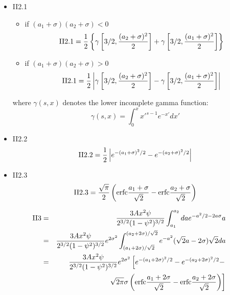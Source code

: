 \documentclass{book}
\begin{document}
\begin{itemize}
\item II2.1
  \begin{itemize}
  \item if $(a_1 + \sigma)(a_2 + \sigma) < 0$
    \begin{equation*}
      \text{II2.1} =  {1 \over 2} \left\{
        \gamma\left[ 3/2, {(a_2 + \sigma)^2 \over 2} \right] +
        \gamma\left[ 3/2, {(a_1 + \sigma)^2 \over 2} \right]
      \right\}
    \end{equation*}
  \item if $(a_1 + \sigma)(a_2 + \sigma) > 0$
    \begin{equation*}
      \text{II2.1} =  {1 \over 2} \left|
        \gamma\left[3/2, {(a_2 + \sigma)^2 \over 2}\right] -
        \gamma\left[3/2, {(a_1 + \sigma)^2\over 2}\right]
      \right|
    \end{equation*}
  \end{itemize}
  where $\gamma(s, x)$ denotes the lower incomplete gamma function:
  \begin{equation*}
    \gamma(s, x) = \int_0^x x'^{s-1} e^{-x'} dx'
  \end{equation*}
\item II2.2
  \begin{equation*}
    \text{II2.2} = {1 \over 2} \left|
      e^{-(a_1 + \sigma)^2/2} - e^{-(a_2 + \sigma)^2/2}
    \right|
  \end{equation*}
\item II2.3
  \begin{equation*}
    \text{II2.3} = {\sqrt{\pi} \over 2} \left(
      \text{erfc} {a_1 + \sigma \over \sqrt 2} - \text{erfc} {a_2 + \sigma \over \sqrt 2}
    \right)
  \end{equation*}
\end{itemize}
\begin{eqnarray*}
  \text{II3} &=& {3Ax^2\psi \over 2^{3/2}(1 - \psi^2)^{3/2}}
  \int_{a_1}^{a_2} da e^{-a^2/2 - 2a\sigma} a \\
  &=& {3Ax^2\psi \over 2^{3/2}(1 - \psi^2)^{3/2}} e^{2\sigma^2}
  \int_{(a_1 + 2\sigma)/\sqrt 2}^{(a_2 + 2\sigma)/\sqrt 2} e^{-a^2}
  (\sqrt{2} a - 2\sigma) \sqrt{2} da \\
  &=& {3Ax^2\psi \over 2^{3/2}(1 - \psi^2)^{3/2}} e^{2\sigma^2} \left[
    e^{-(a_1 + 2\sigma)^2/2} - e^{-(a_2 + 2\sigma)^2/2} - \right.\\
    &&
    \left. \sqrt{2\pi}\sigma \left(
      \text{erfc}{a_1 + 2\sigma \over \sqrt 2} - \text{erfc}{a_2 + 2\sigma \over \sqrt 2}
    \right)
  \right]
\end{eqnarray*}
\end{document}
